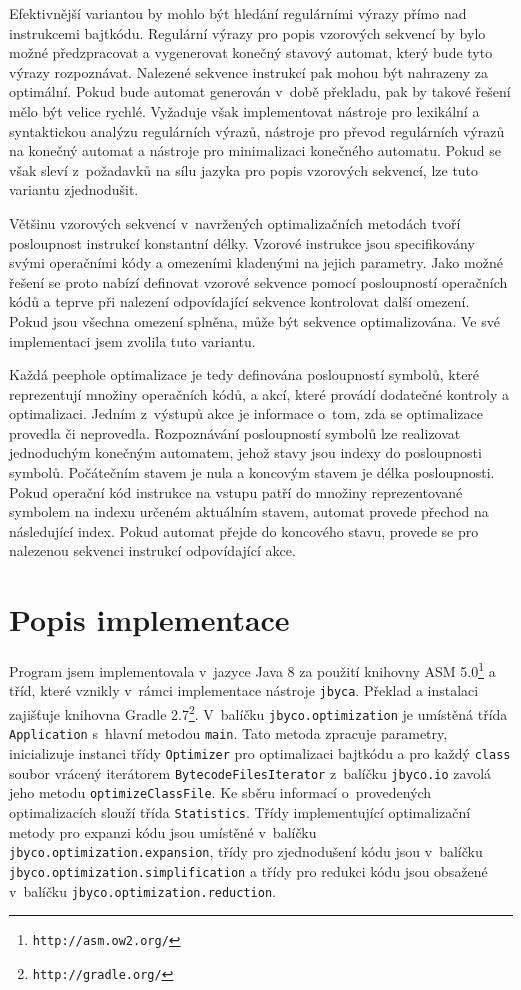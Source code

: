 Efektivnější variantou by mohlo být hledání regulárními výrazy přímo nad instrukcemi bajtkódu. Regulární výrazy pro popis vzorových sekvencí by bylo možné předzpracovat a vygenerovat konečný stavový automat, který bude tyto výrazy rozpoznávat. Nalezené sekvence instrukcí pak mohou být nahrazeny za optimální. Pokud bude automat generován v~době překladu, pak by takové řešení mělo být velice rychlé. Vyžaduje však implementovat nástroje pro lexikální a syntaktickou analýzu regulárních výrazů, nástroje pro převod regulárních výrazů na konečný automat a nástroje pro minimalizaci konečného automatu. Pokud se však sleví z~požadavků na sílu jazyka pro popis vzorových sekvencí, lze tuto variantu zjednodušit.

Většinu vzorových sekvencí v~navržených optimalizačních metodách tvoří posloupnost instrukcí konstantní délky. Vzorové instrukce jsou specifikovány svými operačními kódy a omezeními kladenými na jejich parametry. Jako možné řešení se proto nabízí definovat vzorové sekvence pomocí posloupností operačních kódů a teprve při nalezení odpovídající sekvence kontrolovat další omezení. Pokud jsou všechna omezení splněna, může být sekvence optimalizována. Ve své implementaci jsem zvolila tuto variantu. 

Každá peephole optimalizace je tedy definována posloupností symbolů, které reprezentují množiny operačních kódů, a akcí, které provádí dodatečné kontroly a optimalizaci. Jedním z~výstupů akce je informace o~tom, zda se optimalizace provedla či neprovedla.
Rozpoznávání posloupností symbolů lze realizovat jednoduchým konečným automatem, jehož stavy jsou indexy do posloupnosti symbolů. Počátečním stavem je nula a koncovým stavem je délka posloupnosti. Pokud operační kód instrukce na vstupu patří do množiny reprezentované symbolem na indexu určeném aktuálním stavem, automat provede přechod na následující index. Pokud automat přejde do koncového stavu, provede se pro nalezenou sekvenci instrukcí odpovídající akce.

\section{Popis implementace}

Program jsem implementovala v~jazyce Java 8 za použití knihovny ASM 5.0\footnote{\texttt{http://asm.ow2.org/}} a tříd, které vznikly v~rámci implementace nástroje \texttt{jbyca}. Překlad a instalaci zajišťuje knihovna Gradle 2.7\footnote{\texttt{http://gradle.org/}}. V~balíčku \texttt{jbyco.optimization} je umístěná třída \texttt{Application} s~hlavní metodou \texttt{main}. Tato metoda zpracuje parametry, inicializuje instanci třídy \texttt{Optimizer} pro optimalizaci bajtkódu a pro každý \texttt{class} soubor vrácený iterátorem \texttt{BytecodeFilesIterator} z~balíčku \texttt{jbyco.io} zavolá jeho metodu \texttt{optimizeClassFile}. Ke sběru informací o~provedených optimalizacích slouží třída \texttt{Statistics}. Třídy implementující optimalizační metody pro expanzi kódu jsou umístěné v~balíčku \texttt{jbyco.optimization.expansion}, třídy pro zjednodušení kódu jsou v~balíčku \texttt{jbyco.optimization.simplification} a třídy pro redukci kódu jsou obsažené v~balíčku \texttt{jbyco.optimization.reduction}.

